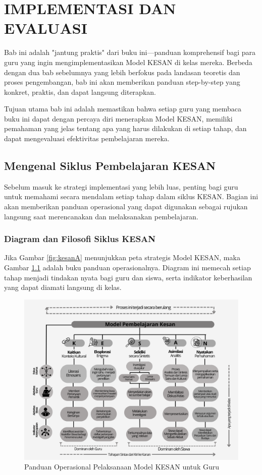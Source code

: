 \documentclass[12pt,a4paper,oneside]{book}
\begin{document}
\chapter{IMPLEMENTASI DAN EVALUASI}

Bab ini adalah "jantung praktis" dari buku ini—panduan komprehensif bagi para guru yang ingin mengimplementasikan Model KESAN di kelas mereka. Berbeda dengan dua bab sebelumnya yang lebih berfokus pada landasan teoretis dan proses pengembangan, bab ini akan memberikan panduan step-by-step yang konkret, praktis, dan dapat langsung diterapkan.

Tujuan utama bab ini adalah memastikan bahwa setiap guru yang membaca buku ini dapat dengan percaya diri menerapkan Model KESAN, memiliki pemahaman yang jelas tentang apa yang harus dilakukan di setiap tahap, dan dapat mengevaluasi efektivitas pembelajaran mereka.

\section{Mengenal Siklus Pembelajaran KESAN}

Sebelum masuk ke strategi implementasi yang lebih luas, penting bagi guru untuk memahami secara mendalam setiap tahap dalam siklus KESAN. Bagian ini akan memberikan panduan operasional yang dapat digunakan sebagai rujukan langsung saat merencanakan dan melaksanakan pembelajaran.

\subsection{Diagram dan Filosofi Siklus KESAN}

Jika Gambar \ref{fig:kesanA} menunjukkan peta strategis Model KESAN, maka Gambar \ref{fig:kesanB} adalah buku panduan operasionalnya. Diagram ini memecah setiap tahap menjadi tindakan nyata bagi guru dan siswa, serta indikator keberhasilan yang dapat diamati langsung di kelas.

\begin{figure}[H]
\centering
\includegraphics[width=1.1\textwidth]{kesanB.png}
\caption{Panduan Operasional Pelaksanaan Model KESAN untuk Guru}
\label{fig:kesanB}
\end{figure}
\end{document}
